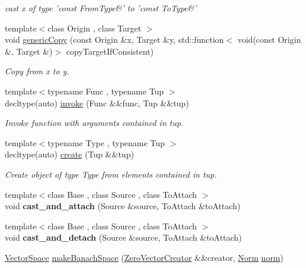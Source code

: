 \begin{DoxyCompactItemize}
\begin{DoxyCompactList}\small\item\em cast x of type 'const From\-Type\&' to 'const To\-Type\&' \end{DoxyCompactList}\item 
{\footnotesize template$<$class Origin , class Target $>$ }\\void \hyperlink{namespaceSpacy_a7dd8ce352c45e326cf8966befd5159ce}{generic\-Copy} (const Origin \&x, Target \&y, std\-::function$<$ void(const Origin \&, Target \&)$>$ copy\-Target\-If\-Consistent)
\begin{DoxyCompactList}\small\item\em Copy from x to y. \end{DoxyCompactList}\item 
{\footnotesize template$<$typename Func , typename Tup $>$ }\\decltype(auto) \hyperlink{namespaceSpacy_a64250818ba7ff711c207af6ab40ff986}{invoke} (Func \&\&func, Tup \&\&tup)
\begin{DoxyCompactList}\small\item\em Invoke function with arguments contained in tup. \end{DoxyCompactList}\item 
{\footnotesize template$<$typename Type , typename Tup $>$ }\\decltype(auto) \hyperlink{namespaceSpacy_ae823c82326475d3cc3b166533deddf21}{create} (Tup \&\&tup)
\begin{DoxyCompactList}\small\item\em Create object of type Type from elements contained in tup. \end{DoxyCompactList}\item 
\hypertarget{namespaceSpacy_a84ea9f9186cc834141aa9fa996521007}{{\footnotesize template$<$class Base , class Source , class To\-Attach $>$ }\\void {\bfseries cast\-\_\-and\-\_\-attach} (Source \&source, To\-Attach \&to\-Attach)}\label{namespaceSpacy_a84ea9f9186cc834141aa9fa996521007}

\item 
\hypertarget{namespaceSpacy_a8cb35e7115d5c299e260e7c196770df9}{{\footnotesize template$<$class Base , class Source , class To\-Attach $>$ }\\void {\bfseries cast\-\_\-and\-\_\-detach} (Source \&source, To\-Attach \&to\-Attach)}\label{namespaceSpacy_a8cb35e7115d5c299e260e7c196770df9}

\item 
\hypertarget{namespaceSpacy_a0b66c8f2345b693504180dc7fb187958}{\hyperlink{classSpacy_1_1VectorSpace}{Vector\-Space} \hyperlink{namespaceSpacy_a0b66c8f2345b693504180dc7fb187958}{make\-Banach\-Space} (\hyperlink{classSpacy_1_1ZeroVectorCreator}{Zero\-Vector\-Creator} \&\&creator, \hyperlink{namespaceSpacy_a0dbe77a4e1282ef88017e94d50d17791}{Norm} \hyperlink{namespaceSpacy_a86a4fc266aa19a07b0af16388907354b}{norm})}\label{namespaceSpacy_a0b66c8f2345b693504180dc7fb187958}


\end{DoxyCompactItemize}
